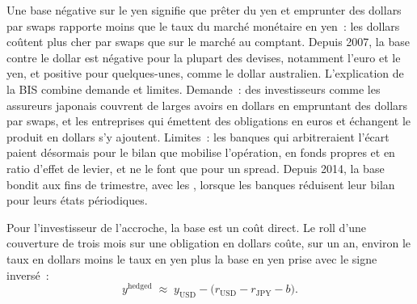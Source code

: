Une base négative sur le yen signifie que prêter du yen et emprunter des dollars par
swaps rapporte moins que le taux du marché monétaire en yen~: les dollars coûtent plus cher
par swaps que sur le marché au comptant. Depuis 2007, la base contre le dollar est négative pour
la plupart des devises, notamment l'euro et le yen, et positive pour quelques-unes, comme
le dollar australien. L'explication de la BIS combine demande et limites. Demande~:
des investisseurs comme les assureurs japonais couvrent de larges avoirs en dollars en empruntant
des dollars par swaps, et les entreprises qui émettent des obligations en euros et échangent le produit
en dollars s'y ajoutent. Limites~: les banques qui arbitreraient l'écart paient désormais
pour le bilan que mobilise l'opération, en fonds propres et en ratio d'effet de levier, et ne le font
que pour un spread. Depuis 2014, la base bondit aux fins de trimestre, avec les ,
lorsque les banques réduisent leur bilan pour leurs états périodiques.

Pour l'investisseur de l'accroche, la base est un coût direct. Le roll d'une couverture
de trois mois sur une obligation en dollars coûte, sur un an, environ le taux en dollars moins le taux
en yen plus la base en yen prise avec le signe inversé~:
\begin{equation}\label{eq:m2:fx-swaps-forwards-and-the-cross-currency-basis:hedged}
y^{\mathrm{hedged}} \;\approx\; y_{\mathrm{USD}} - \bigl(r_{\mathrm{USD}} - r_{\mathrm{JPY}} - b\bigr).
\end{equation}

